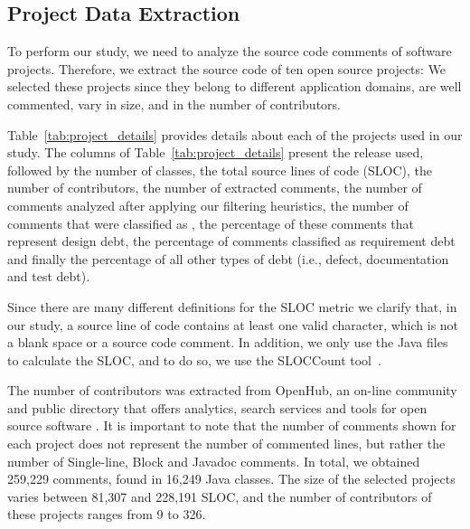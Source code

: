 \subsection{Project Data Extraction}
\label{sub:data_extraction}

To perform our study, we need to analyze the source code comments of software projects. Therefore, we extract the source code of ten open source projects: We selected these projects since they belong to different application domains, are well commented, vary in size, and in the number of contributors. 
    
Table~\ref{tab:project_details} provides details about each of the projects used in our study. The columns of Table~\ref{tab:project_details} present the release used, followed by the number of classes, the total source lines of code (SLOC), the number of contributors, the number of extracted comments, the number of comments analyzed after applying our filtering heuristics, the number of comments that were classified as \SATD, the percentage of these comments that represent design debt, the percentage of \SATD comments classified as requirement debt and finally the percentage of all other types of debt (i.e., defect, documentation and test debt). 

Since there are many different definitions for the SLOC metric we clarify that, in our study, a source line of code contains at least one valid character, which is not a blank space or a source code comment. In addition, we only use the Java files to calculate the SLOC, and to do so, we use the SLOCCount tool~\cite{wheeler2004:home}. 

The number of contributors was extracted from OpenHub, an on-line community and public directory that offers analytics, search services and tools for open source software \cite{Openhub:home}. It is important to note that the number of comments shown for each project does not represent the number of commented lines, but rather the number of Single-line, Block and Javadoc comments. In total, we obtained 259,229 comments, found in 16,249 Java classes. The size of the selected projects varies between 81,307 and 228,191 SLOC, and the number of contributors of these projects ranges from 9 to 326. 


